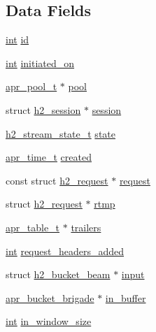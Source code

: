 \subsection*{Data Fields}
\begin{DoxyCompactItemize}
\item 
\hyperlink{pcre_8txt_a42dfa4ff673c82d8efe7144098fbc198}{int} \hyperlink{structh2__stream_a83ccde49eb87a47e7ad897e4a6d86968}{id}
\item 
\hyperlink{pcre_8txt_a42dfa4ff673c82d8efe7144098fbc198}{int} \hyperlink{structh2__stream_a9b71d06237201b5603165ee2cc827c4f}{initiated\+\_\+on}
\item 
\hyperlink{structapr__pool__t}{apr\+\_\+pool\+\_\+t} $\ast$ \hyperlink{structh2__stream_abbb079f0128ec6d60268f1944b0fa910}{pool}
\item 
struct \hyperlink{structh2__session}{h2\+\_\+session} $\ast$ \hyperlink{structh2__stream_ada5aa5b5cfb85fbb1023c1891b226b47}{session}
\item 
\hyperlink{h2_8h_a11ead6d11a09b57da2ee00db88b19baf}{h2\+\_\+stream\+\_\+state\+\_\+t} \hyperlink{structh2__stream_a7efd6de540c234955a7cd92f64e788bc}{state}
\item 
\hyperlink{group__apr__time_gadb4bde16055748190eae190c55aa02bb}{apr\+\_\+time\+\_\+t} \hyperlink{structh2__stream_a99db8afbff0bea2e9a4bcf2e1e212dae}{created}
\item 
const struct \hyperlink{structh2__request}{h2\+\_\+request} $\ast$ \hyperlink{structh2__stream_ab9f07c71f46f18fe69138765075ba88c}{request}
\item 
struct \hyperlink{structh2__request}{h2\+\_\+request} $\ast$ \hyperlink{structh2__stream_a4ae771785b1c05398ebeebaaf42e8643}{rtmp}
\item 
\hyperlink{structapr__table__t}{apr\+\_\+table\+\_\+t} $\ast$ \hyperlink{structh2__stream_a13e3f7f6ed16befdf6c0e5fb361650f9}{trailers}
\item 
\hyperlink{pcre_8txt_a42dfa4ff673c82d8efe7144098fbc198}{int} \hyperlink{structh2__stream_a9dadd07a7b46ff14ec602ae469b78ab2}{request\+\_\+headers\+\_\+added}
\item 
struct \hyperlink{structh2__bucket__beam}{h2\+\_\+bucket\+\_\+beam} $\ast$ \hyperlink{structh2__stream_a59a070444bb2dc9b5c8964ddf0eb8844}{input}
\item 
\hyperlink{structapr__bucket__brigade}{apr\+\_\+bucket\+\_\+brigade} $\ast$ \hyperlink{structh2__stream_ac1d83345e454d8b879818d3dd7624780}{in\+\_\+buffer}
\item 
\hyperlink{pcre_8txt_a42dfa4ff673c82d8efe7144098fbc198}{int} \hyperlink{structh2__stream_a702761712de1c2906b446dd01313b813}{in\+\_\+window\+\_\+size}

\end{DoxyCompactItemize}
